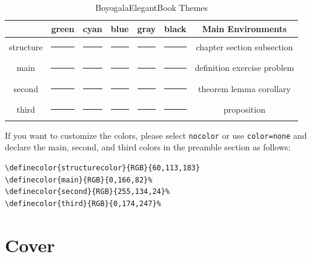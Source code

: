 \documentclass[11pt]{boyogalaelegantbook}
\begin{document}
\begin{table}[htbp]
\caption{BoyogalaElegantBook Themes\label{tab:color thm}}
\centering
\begin{tabular}{ccccccc}
\toprule
          & \textcolor{structure1}{green} 
          & \textcolor{structure2}{cyan} 
          & \textcolor{structure3}{blue}
          & \textcolor{structure4}{gray} 
          & \textcolor{structure5}{black} 
          & Main Environments\\
\midrule
structure & {\color{structure1}\rule{1cm}{1cm}}
        & {\color{structure2}\rule{1cm}{1cm}}
        & {\color{structure3}\rule{1cm}{1cm}} 
        & {\color{structure4}\rule{1cm}{1cm}} 
        & {\color{structure5}\rule{1cm}{1cm}} 
        & chapter  section  subsection \\
main      & {\color{main1}\rule{1cm}{1cm}}
        & {\color{main2}\rule{1cm}{1cm}}
        & {\color{main3}\rule{1cm}{1cm}}
        & {\color{main4}\rule{1cm}{1cm}}
        & {\color{main5}\rule{1cm}{1cm}}
        & definition  exercise  problem  \\
second    & {\color{second1}\rule{1cm}{1cm}}
        & {\color{second2}\rule{1cm}{1cm}}
        & {\color{second3}\rule{1cm}{1cm}}
        & {\color{second4}\rule{1cm}{1cm}}
        & {\color{second5}\rule{1cm}{1cm}}
        & theorem  lemma  corollary\\
third     & {\color{third1}\rule{1cm}{1cm}}
        & {\color{third2}\rule{1cm}{1cm}}
        & {\color{third3}\rule{1cm}{1cm}}
        & {\color{third4}\rule{1cm}{1cm}}
        & {\color{third5}\rule{1cm}{1cm}}
        & proposition\\
\bottomrule
\end{tabular}
\end{table}

If you want to customize the colors, please select \lstinline{nocolor} or use \lstinline{color=none} and declare the main, second, and third colors in the preamble section as follows:
\begin{lstlisting}[frame=single]
\definecolor{structurecolor}{RGB}{60,113,183}
\definecolor{main}{RGB}{0,166,82}%
\definecolor{second}{RGB}{255,134,24}%
\definecolor{third}{RGB}{0,174,247}% 
\end{lstlisting}

\section{Cover}
\end{document}
